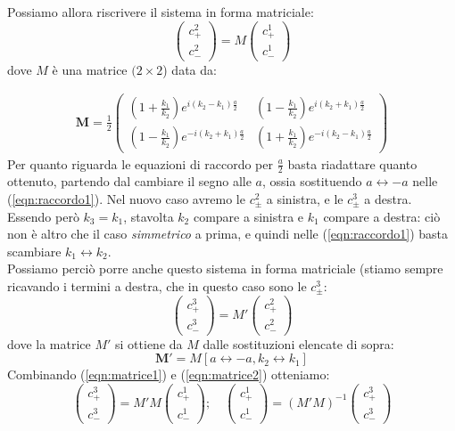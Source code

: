 \documentclass[../../FisicaTeorica.tex]{subfiles}
\begin{document}
Possiamo allora riscrivere il sistema in forma matriciale:
\begin{equation}
\begin{pmatrix}
c^2_+\\
c^2_-
\end{pmatrix} =
M \begin{pmatrix}
c^1_+\\
c^1_-
\end{pmatrix}
\label{eqn:matrice1}
\end{equation}
dove $M$ è una matrice $(2\times 2$) data da:

\begin{align*}%
\bm{M}=\frac{1}{2}\begin{pmatrix}
\left(1+\frac{k_1}{k_2}\right)e^{i(k_2-k_1)\frac{a}{2}} & \left (
1-\frac{k_1}{k_2}
\right)
e^{i(k_2+k_1)\frac{a}{2}}\\
\left(1-\frac{k_1}{k_2}\right)e^{-i(k_2+k_1)\frac{a}{2}} & \left(1+\frac{k_1}{k_2}\right)e^{-i(k_2-k_1)\frac{a}{2}}
\end{pmatrix}
\end{align*}
Per quanto riguarda le equazioni di raccordo per $\frac{a}{2}$ basta riadattare quanto ottenuto, partendo dal cambiare il segno alle $a$, ossia sostituendo $a\leftrightarrow -a$ nelle (\ref{eqn:raccordo1}). Nel nuovo caso avremo le $c^2_\pm$ a sinistra, e le $c^3_\pm$ a destra.\\
 Essendo però $k_3 = k_1$, stavolta $k_2$ compare a sinistra e $k_1$ compare a destra: ciò non è altro che il caso \textit{simmetrico} a prima, e quindi nelle (\ref{eqn:raccordo1}) basta scambiare $k_1 \leftrightarrow k_2$.\\
Possiamo perciò porre anche questo sistema in forma matriciale (stiamo sempre ricavando i termini a destra, che in questo caso sono le $c^3_\pm$:
\begin{equation}
\begin{pmatrix}
c^3_+\\
c^3_-
\end{pmatrix}
= M'
\begin{pmatrix}
c^2_+\\
c^2_-
\end{pmatrix}
\label{eqn:matrice2}
\end{equation}
dove la matrice $M'$ si ottiene da $M$ dalle sostituzioni elencate di sopra:
\[
\bm{M'}=M[a\leftrightarrow -a, k_2 \leftrightarrow k_1]
\]
Combinando (\ref{eqn:matrice1}) e (\ref{eqn:matrice2}) otteniamo:
\begin{equation}
\begin{pmatrix}
c^3_+\\
c^3_-
\end{pmatrix} = M'M\begin{pmatrix}
c^1_+\\
c^1_-
\end{pmatrix}; \quad \begin{pmatrix}
c^1_+\\
c^1_-
\end{pmatrix}=(M'M)^{-1}\begin{pmatrix}
c^3_+\\
c^3_-
\end{pmatrix}
\label{eqn:matrice3}
\end{equation}
\end{document}
